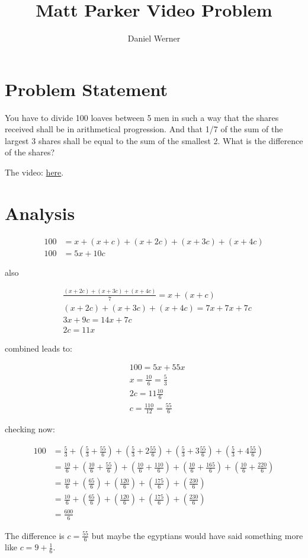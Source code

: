 \documentclass{article}
\title{Matt Parker Video Problem}
\author{Daniel Werner}
\begin{document}
\maketitle

\section*{Problem Statement}
You have to divide 100 loaves between 5 men in such a way that the shares received shall be in arithmetical progression. And that 1/7 of the sum of the largest 3 shares shall be equal to the sum of the smallest 2. What is the difference of the shares?

The video: \href{https://www.youtube.com/watch?v=g_qbIsltNmQ}{here}.

\section*{Analysis}

\begin{align*}
    100 &= x + (x + c) + (x + 2c) + (x + 3 c) + (x + 4c) \\
    100 &= 5x + 10c
\end{align*}

also

\begin{align*}
    &\frac{(x + 2c) + (x + 3 c) + (x + 4c)}{7} = x + (x + c) \\
    &(x + 2c) + (x + 3 c) + (x + 4c) = 7x + 7x + 7c \\
    &3x + 9c = 14x + 7c \\
    &2c = 11x
\end{align*}

combined leads to:

\begin{align*}
    &100 = 5x + 55x \\
    &x = \frac{10}{6} = \frac{5}{3} \\
    &2c = 11 \frac{10}{6} \\
    &c = \frac{110}{12} = \frac{55}{6}
\end{align*}

checking now:

\begin{align*}
    100 &= \frac{5}{3} + 
    (\frac{5}{3} + \frac{55}{6}) + 
    (\frac{5}{3} + 2\frac{55}{6}) + 
    (\frac{5}{3} + 3 \frac{55}{6}) + 
    (\frac{5}{3} + 4\frac{55}{6}) \\
    &= \frac{10}{6} + 
    (\frac{10}{6} + \frac{55}{6}) + 
    (\frac{10}{6} + \frac{110}{6}) + 
    (\frac{10}{6} + \frac{165}{6}) + 
    (\frac{10}{6} + \frac{220}{6}) \\
    &= \frac{10}{6} + 
    (\frac{65}{6}) + 
    (\frac{120}{6}) + 
    (\frac{175}{6}) + 
    (\frac{230}{6}) \\
    &= \frac{10}{6} + 
    (\frac{65}{6}) + 
    (\frac{120}{6}) + 
    (\frac{175}{6}) + 
    (\frac{230}{6}) \\
    &= \frac{600}{6}
\end{align*}

The difference is $c = \frac{55}{6}$ but maybe the egyptians would have said something more like $c = 9 + \frac{1}{6}$.
\end{document}
